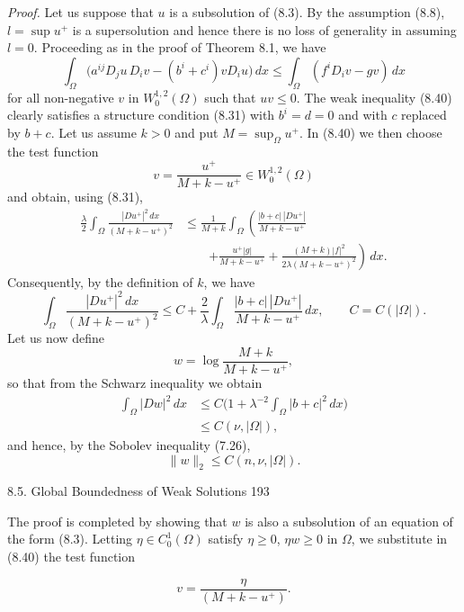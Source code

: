 \noindent\emph{Proof.} Let us suppose that $u$ is a subsolution of (8.3). By the assumption (8.8), $l=\sup u^+$ is a supersolution and hence there is no loss of generality in assuming
$l=0$. Proceeding as in the proof of Theorem 8.1, we have
\begin{equation}\tag{8.40}
\int_{\Omega}\bigl(a^{ij}D_j u\,D_i v-(b^i+c^i)vD_i u\bigr)\,dx\leq \int_{\Omega}(f^iD_i v-gv)\,dx
\end{equation}
for all non-negative $v$ in $W^{1,2}_0(\Omega)$ such that $uv\leq 0$. The weak inequality (8.40) clearly satisfies a structure condition (8.31) with $b^i=d=0$ and with $c$ replaced by $b+c$. Let us assume $k>0$ and put $M=\sup_{\Omega}u^+$. In (8.40) we then choose the test function
\[
v=\frac{u^+}{M+k-u^+}\in W^{1,2}_0(\Omega)
\]
and obtain, using (8.31),
\begin{align*}
\frac{\lambda}{2}\int_{\Omega}\frac{|Du^+|^2\,dx}{(M+k-u^+)^2}
&\leq \frac{1}{M+k}\int_{\Omega}\left(\frac{|b+c|\,|Du^+|}{M+k-u^+}\right.\\
&\qquad\left.+\frac{u^+|g|}{M+k-u^+}
+\frac{(M+k)|f|^2}{2\lambda(M+k-u^+)^2}\right)\,dx.
\end{align*}
Consequently, by the definition of $k$, we have
\[
\int_{\Omega}\frac{|Du^+|^2\,dx}{(M+k-u^+)^2}\leq C+\frac{2}{\lambda}\int_{\Omega}\frac{|b+c|\,|Du^+|}{M+k-u^+}\,dx,\qquad C=C(|\Omega|).
\]
Let us now define
\[
w=\log\frac{M+k}{M+k-u^+},
\]
so that from the Schwarz inequality we obtain
\begin{align*}
\int_{\Omega}|Dw|^2\,dx&\leq C\bigl(1+\lambda^{-2}\int_{\Omega}|b+c|^2\,dx\bigr)\\
&\leq C(\nu,|\Omega|),
\end{align*}
and hence, by the Sobolev inequality (7.26),
\begin{equation}\tag{8.41}
\|w\|_2\leq C(n,\nu,|\Omega|).
\end{equation}

\begin{flushleft}
8.5. Global Boundedness of Weak Solutions \hfill 193
\end{flushleft}

The proof is completed by showing that $w$ is also a subsolution of an equation of the
form (8.3). Letting $\eta \in C_0^1(\Omega)$ satisfy $\eta \ge 0$, $\eta w \ge 0$ in $\Omega$, we substitute in (8.40)
the test function

\[
 v = \frac{\eta}{(M+k-u^+)}.
\]

